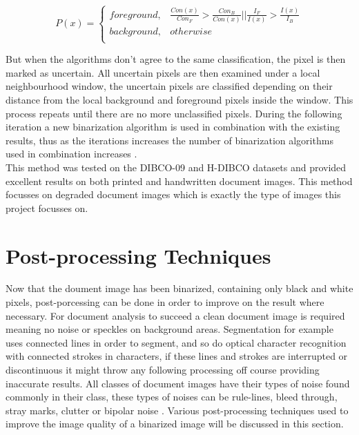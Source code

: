 \documentclass[11pt]{article}
\begin{document}
					\begin{Large}
					\begin{equation} \label{eq:combined_binarization}
					 P(x) =
					 \begin{cases}
						foreground,          & \frac{Con(x)}{Con_F} > \frac{Con_B}{Con(x)} || \frac{I_F}{I(x)} > \frac{I(x)}{I_B}     \\
						background, & otherwise \\
					 \end{cases}
					\end{equation}
					\end{Large}

					\newpage

					But when the algorithms don't agree to the same classification, the pixel is then marked as uncertain. All uncertain pixels are then examined under a local neighbourhood window, the uncertain pixels are classified depending on their distance from the local background and foreground pixels inside the window. This process repeats until there are no more unclassified pixels. During the following iteration a new binarization algorithm is used in combination with the existing results, thus as the iterations increases the number of binarization algorithms used in combination increases \cite{su2011combination}.\\

      		This method was tested on the DIBCO-09 and H-DIBCO datasets and provided excellent results on both printed and handwritten document images. This method focusses on degraded document images which is exactly the type of images this project focusses on.\\

	\section{Post-processing Techniques}
		Now that the doument image has been binarized, containing only black and white pixels, post-porcessing can be done in order to improve on the result where necessary. For document analysis to succeed a clean document image is required meaning no noise or speckles on background areas. Segmentation for example uses connected lines in order to segment, and so do optical character recognition with connected strokes in characters, if these lines and strokes are interrupted or discontinuous it might throw any following processing off course providing inaccurate results. All classes of document images have their types of noise found commonly in their class, these types of noises can be rule-lines, bleed through, stray marks, clutter or bipolar noise \cite{agrawal2011stroke}. Various post-processing techniques used to improve the image quality of a binarized image will be discussed in this section.\\
\end{document}
